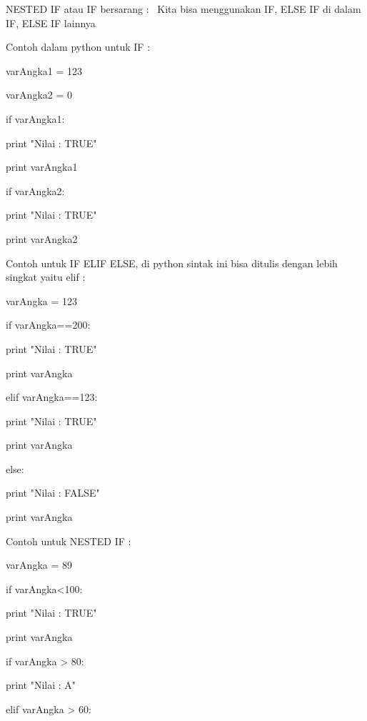  
NESTED IF atau IF bersarang :~ Kita bisa menggunakan IF, ELSE IF di dalam IF, ELSE IF lainnya 

 
Contoh dalam python untuk IF :  

 
varAngka1 = 123 

 
varAngka2 = 0 

 
if varAngka1: 

 
                                                print "Nilai : TRUE" 

 
                                                print varAngka1 

 
if varAngka2: 

 
                                                print "Nilai : TRUE" 

 
                                                print varAngka2{\fontsize{14pt}{14pt}\selectfont     \\} 

 
Contoh untuk IF ELIF ELSE, di python sintak ini bisa ditulis dengan lebih singkat yaitu elif :  

 
varAngka = 123 
 
    
 
if varAngka==200: 

 
                           print "Nilai : TRUE" 

 
                           print varAngka 

 
elif varAngka==123: 

 
                           print "Nilai : TRUE" 

 
                           print varAngka 

 
else: 

 
                           print "Nilai : FALSE" 

 
                           print varAngka 

 
Contoh untuk NESTED IF :  

 
varAngka = 89 
 
    
 
if varAngka<100: 

 
                       print "Nilai : TRUE" 

 
                       print varAngka 

 
                       if varAngka > 80: 

 
                                                print "Nilai : A" 

 
                       elif varAngka > 60: 

